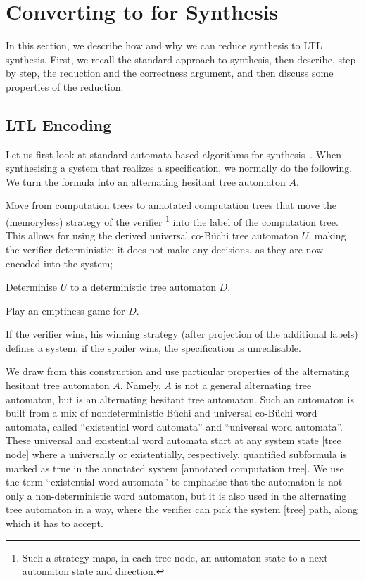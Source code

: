 \section{Converting \CTLstar to \LTL for Synthesis}
\label{sec:reductions-to-ltl}


In this section, we describe how and why we can reduce \CTLstar synthesis
to LTL synthesis.
First, we recall the standard approach to \CTLstar synthesis,
then describe, step by step, the reduction and the correctness argument,
and then discuss some properties of the reduction.

\subsection{LTL Encoding}

Let us first look at standard automata based algorithms for \CTLstar synthesis~\cite{informatio}.
When synthesising a system that realizes a \CTLstar specification, we normally do the following.
\li
\- We turn the \CTLstar formula into an alternating hesitant tree automaton $A$.

\- Move from computation trees to annotated computation trees that move the (memoryless) strategy of the verifier%
   \footnote{Such a strategy maps, in each tree node, an automaton state to a next automaton state and direction.}
   into the label of the computation tree.
   This allows for using the derived universal co-B\"uchi tree automaton $U$,
   making the verifier deterministic: it does not make any decisions, as they are now encoded into the system;

\- Determinise $U$ to a deterministic tree automaton $D$.

\- Play an emptiness game for $D$.

\- If the verifier wins, his winning strategy (after projection of the additional labels) defines a system, if the spoiler wins, the specification is unrealisable.
\il

We draw from this construction and use particular properties of the alternating hesitant tree automaton $A$.
Namely, $A$ is not a general alternating tree automaton,
but is an alternating hesitant tree automaton.
Such an automaton is built from a mix of nondeterministic B\"uchi
and universal co-B\"uchi word automata,
called ``existential word automata'' and ``universal word automata''.
These universal and existential word automata start at any system state [tree node] where a universally or existentially, respectively, quantified subformula is marked as true in the annotated system [annotated computation tree].
We use the term ``existential word automata'' to emphasise that the automaton is not only a non-deterministic word automaton, but it is also used in the alternating tree automaton in a way, where the verifier can pick the system [tree] path, along which it has to accept.

